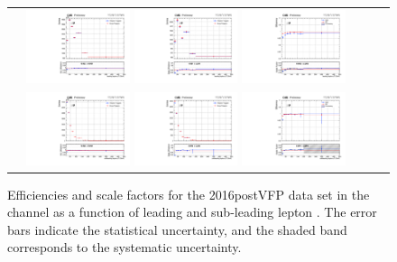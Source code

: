 \begin{figure}[!htb]
  \begin{center}
    \begin{tabular}{ccc}
      \includegraphics[width=0.30\textwidth]{fig_2016postVFP_TrigSF/g_lepApt_mumu_MC.pdf}
      \includegraphics[width=0.30\textwidth]{fig_2016postVFP_TrigSF/g_lepApt_mumu_data.pdf}
      \includegraphics[width=0.30\textwidth]{fig_2016postVFP_TrigSF/g_mumu_lepApt_FullSystUncBand.pdf}\\
      \includegraphics[width=0.30\textwidth]{fig_2016postVFP_TrigSF/g_lepBpt_mumu_MC.pdf}
      \includegraphics[width=0.30\textwidth]{fig_2016postVFP_TrigSF/g_lepBpt_mumu_data.pdf}
      \includegraphics[width=0.30\textwidth]{fig_2016postVFP_TrigSF/g_mumu_lepBpt_FullSystUncBand.pdf}\\
    \end{tabular}
    \caption{Efficiencies and scale factors for the 2016postVFP data set in the \mumu channel as a function of leading and sub-leading lepton \pT.
            The error bars indicate the statistical uncertainty, and the shaded band corresponds to the systematic uncertainty.
            }
    \label{TrigSF_2016postVFP_3}
  \end{center}
\end{figure}

